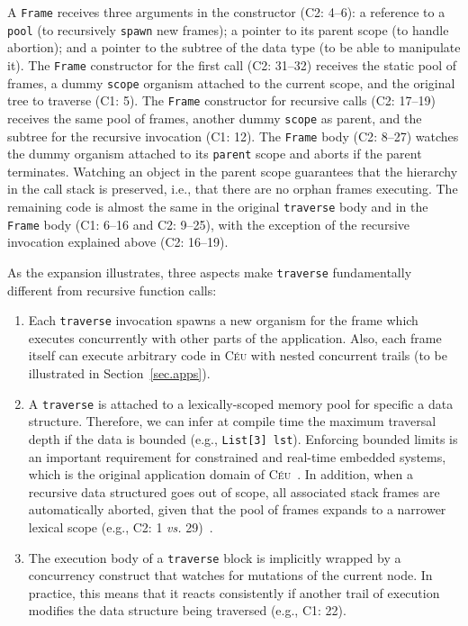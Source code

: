 \documentclass{sig-alternate}
\newcommand{\CEU}{\textsc{C\'{e}u}\xspace}
\newcommand{\code}[1] {{\small{\texttt{#1}}}}
\newcommand{\MM}[1] {\textcircled{\tiny{\textsf{#1}}}}
\begin{document}
A \code{Frame} receives three arguments in the constructor (\MM{C2}: 4--6):
a reference to a \code{pool} (to recursively \code{spawn} new frames);
a pointer to its parent scope (to handle abortion);
and a pointer to the subtree of the data type (to be able to manipulate it).
%
The \code{Frame} constructor for the first call (\MM{C2}: 31--32) receives the 
static pool of frames, a dummy \code{scope} organism attached to the current 
scope, and the original tree to traverse (\MM{C1}: 5).
%
The \code{Frame} constructor for recursive calls (\MM{C2}: 17--19) receives the 
same pool of frames, another dummy \code{scope} as parent, and the 
subtree for the recursive invocation (\MM{C1}: 12).
%
The \code{Frame} body (\MM{C2}: 8--27) watches the dummy organism attached to 
its \code{parent} scope and aborts if the parent terminates.
Watching an object in the parent scope guarantees that the hierarchy in the call stack 
is preserved, i.e., that there are no orphan frames executing.
%
The remaining code is almost the same in the original \code{traverse} body and 
in the \code{Frame} body (\MM{C1}: 6--16 and \MM{C2}: 9--25), with the 
exception of the recursive invocation explained above (\MM{C2}: 16--19).

As the expansion illustrates, three aspects make \code{traverse} fundamentally 
different from recursive function calls:
%
\begin{enumerate}
\item Each \code{traverse} invocation spawns a new organism for the frame which 
executes concurrently with other parts of the application.
Also, each frame itself can execute arbitrary code in \CEU with nested 
concurrent trails (to be illustrated in Section~\ref{sec.apps}).
%
\item A \code{traverse} is attached to a lexically-scoped memory pool for 
specific a data structure.
Therefore, we can infer at compile time the maximum traversal depth if the data 
is bounded (e.g., \code{List[3] lst}).
Enforcing bounded limits is an important requirement for constrained and 
real-time embedded systems, which is the original application domain of 
\CEU~\cite{ceu.sensys13}.
In addition, when a recursive data structured goes out of scope, all associated 
stack frames are automatically aborted, given that the pool of frames expands 
to a narrower lexical scope (e.g., \MM{C2}: 1 \emph{vs.} 29)~\cite{ceu.mod15}.
%
\item The execution body of a \code{traverse} block is implicitly wrapped by a 
concurrency construct that watches for mutations of the current node.
In practice, this means that it reacts consistently if another trail of 
execution modifies the data structure being traversed (e.g., \MM{C1}: 22).
\end{enumerate}
\end{document}
